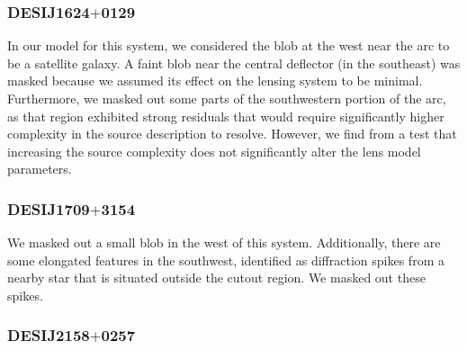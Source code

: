 \documentclass{aa}
\begin{document}

\subsubsection{DESIJ1624$+$0129}

In our model for this system, we considered the blob at the west near the arc to be a satellite galaxy. A faint blob near the central deflector (in the southeast) was masked because we assumed its effect on the lensing system to be minimal. Furthermore, we masked out some parts of the southwestern portion of the arc, as that region exhibited strong residuals that would require significantly higher complexity in the source description to resolve. However, we find from a test that increasing the source complexity does not significantly alter the lens model parameters.


\subsubsection{DESIJ1709$+$3154}

We masked out a small blob in the west of this system. Additionally, there are some elongated features in the southwest, identified as diffraction spikes from a nearby star that is situated outside the cutout region. We masked out these spikes.


\subsubsection{DESIJ2158$+$0257}
\end{document}

